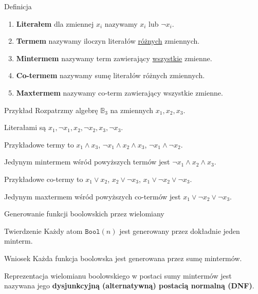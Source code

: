 \documentclass[a4paper,10pt]{beamer}
\begin{document}
\begin{frame}
	
	\begin{block}{Definicja}
		\begin{enumerate}
			\item {\bf Literałem} dla zmiennej $x_i$ nazywamy $x_i$ lub $\neg x_i$.
			\item {\bf Termem} nazywamy iloczyn literałów \underline{różnych} zmiennych.
			\item {\bf Mintermem} nazywamy term zawierający \underline{wszystkie} zmienne.
			\item {\bf Co-termem} nazywamy sumę literałów różnych zmiennych.
			\item {\bf Maxtermem} nazywamy co-term zawierający wszystkie zmienne.
		\end{enumerate}
	\end{block}

	\begin{exampleblock}{Przykład}
		Rozpatrzmy algebrę $\mathbb{B}_3$ na zmiennych $x_1,x_2,x_3$.
		
		Literałami są $x_1,\neg x_1,x_2,\neg x_2, x_3,\neg x_3$.
		
		Przykładowe termy to $x_1\wedge x_3$, $\neg x_1 \wedge x_2 \wedge x_3$, $\neg x_1 \wedge \neg x_2$. 
		
		Jedynym mintermem wśród powyższych termów jest $\neg x_1 \wedge x_2 \wedge x_3$.
		
		Przykładowe co-termy to $x_1 \vee x_2$, $x_2\vee \neg x_3$, $x_1 \vee \neg x_2\vee \neg x_3$. 
		
		Jedynym maxtermem wśród powyższych co-termów jest $x_1 \vee \neg x_2\vee \neg x_3$.
		
	\end{exampleblock}
	
\end{frame}



\begin{frame}{Generowanie funkcji boolowskich przez wielomiany}
	
	\begin{block}{Twierdzenie}
		Każdy atom $\mathtt{Bool}(n)$ jest generowany przez dokładnie jeden minterm.
	\end{block}

	\begin{block}{Wniosek}
		Każda funkcja boolowska jest generowana przez sumę mintermów.
	\end{block}

	Reprezentacja wielomianu boolowskiego w postaci sumy mintermów jest nazywana jego {\bf dysjunkcyjną (alternatywną) postacią normalną (DNF)}.
	
\end{frame}
		
\end{document}
